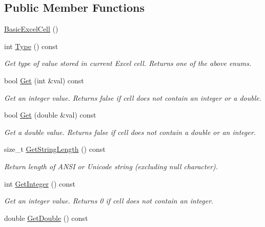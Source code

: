 \subsection*{Public Member Functions}
\begin{DoxyCompactItemize}
\item 
\hyperlink{class_y_excel_1_1_basic_excel_cell_a9f3231a6035eb58aad2a0e9ffaca3b29}{Basic\+Excel\+Cell} ()
\item 
int \hyperlink{class_y_excel_1_1_basic_excel_cell_aa9d27d98a1cb2635c7d2019212c18963}{Type} () const 
\begin{DoxyCompactList}\small\item\em Get type of value stored in current Excel cell. Returns one of the above enums. \end{DoxyCompactList}\item 
bool \hyperlink{class_y_excel_1_1_basic_excel_cell_a6c38d9da9a645ed8006de3b784d8a1f2}{Get} (int \&val) const 
\begin{DoxyCompactList}\small\item\em Get an integer value. Returns false if cell does not contain an integer or a double. \end{DoxyCompactList}\item 
bool \hyperlink{class_y_excel_1_1_basic_excel_cell_a74199e7dd46b22fd0b67ee42e652ee49}{Get} (double \&val) const 
\begin{DoxyCompactList}\small\item\em Get a double value. Returns false if cell does not contain a double or an integer. \end{DoxyCompactList}\item 
size\+\_\+t \hyperlink{class_y_excel_1_1_basic_excel_cell_a2ca927d2a0d52d5036c71c7cdfb07a3e}{Get\+String\+Length} () const 
\begin{DoxyCompactList}\small\item\em Return length of A\+N\+S\+I or Unicode string (excluding null character). \end{DoxyCompactList}\item 
int \hyperlink{class_y_excel_1_1_basic_excel_cell_af171d3ac7bd0873073832720d6857c9e}{Get\+Integer} () const 
\begin{DoxyCompactList}\small\item\em Get an integer value. Returns 0 if cell does not contain an integer. \end{DoxyCompactList}\item 
double \hyperlink{class_y_excel_1_1_basic_excel_cell_adddf212804f649bfbca5329b8c34b5fa}{Get\+Double} () const 

\end{DoxyCompactItemize}
